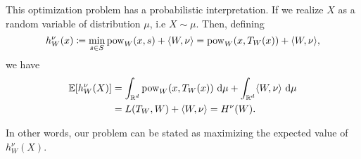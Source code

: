 \documentclass[
     12pt,         %
     a4paper,      %
     BCOR=10mm,     %
     DIV=14,        %
     ]{scrreprt}
\begin{document}
    This optimization problem has a probabilistic interpretation. If we realize $X$ as a random variable of distribution $\mu$, i.e $X \sim \mu$. Then, defining 
    \[h_W^\nu(x) \coloneqq \min_{s\in S} \operatorname{pow}_W(x,s) + \langle W, \nu  \rangle = \operatorname{pow}_W(x,T_W(x)) + \langle W, \nu  \rangle , \]
    we have
    \begin{align*}
        \operatorname{\mathbb{E}}[h_W^\nu(X)] &= \int_{\operatorname{\mathbb{R}}^d} \operatorname{pow}_W(x,T_W(x))  \ {\operatorname{{\mathrm{d}}}} \mu + \int_{\operatorname{\mathbb{R}}^d} \langle W, \nu  \rangle  \ {\operatorname{{\mathrm{d}}}} \mu \\
                       &= L(T_W, W) + \langle W, \nu  \rangle = H^\nu(W).
    \end{align*}

    In other words, our problem can be stated as maximizing the expected value of $h_W^\nu(X)$.
     
%
%
\end{document}
